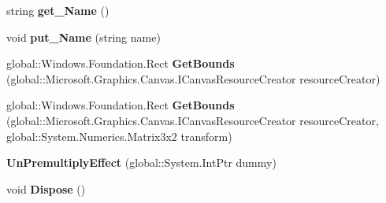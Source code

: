 \begin{DoxyCompactItemize}
\item 
\mbox{\label{class_microsoft_1_1_graphics_1_1_canvas_1_1_effects_1_1_un_premultiply_effect_a1701d736dba660f462b011581f055b17}} 
string {\bfseries get\+\_\+\+Name} ()
\item 
\mbox{\label{class_microsoft_1_1_graphics_1_1_canvas_1_1_effects_1_1_un_premultiply_effect_acd1571fa9f397e1baa0a8c32080b1c2d}} 
void {\bfseries put\+\_\+\+Name} (string name)
\item 
\mbox{\label{class_microsoft_1_1_graphics_1_1_canvas_1_1_effects_1_1_un_premultiply_effect_a5100abdc8715c4ba995f6f6a6e0cb593}} 
global\+::\+Windows.\+Foundation.\+Rect {\bfseries Get\+Bounds} (global\+::\+Microsoft.\+Graphics.\+Canvas.\+I\+Canvas\+Resource\+Creator resource\+Creator)
\item 
\mbox{\label{class_microsoft_1_1_graphics_1_1_canvas_1_1_effects_1_1_un_premultiply_effect_a88c2619b79305957a357452b58d66be6}} 
global\+::\+Windows.\+Foundation.\+Rect {\bfseries Get\+Bounds} (global\+::\+Microsoft.\+Graphics.\+Canvas.\+I\+Canvas\+Resource\+Creator resource\+Creator, global\+::\+System.\+Numerics.\+Matrix3x2 transform)
\item 
\mbox{\label{class_microsoft_1_1_graphics_1_1_canvas_1_1_effects_1_1_un_premultiply_effect_afec8af676d2e6c2a8e095f427e8782f9}} 
{\bfseries Un\+Premultiply\+Effect} (global\+::\+System.\+Int\+Ptr dummy)
\item 
\mbox{\label{class_microsoft_1_1_graphics_1_1_canvas_1_1_effects_1_1_un_premultiply_effect_a046dc1273449b99a5005b41f3a9300ee}} 
void {\bfseries Dispose} ()
\item 
\mbox{\label{class_microsoft_1_1_graphics_1_1_canvas_1_1_effects_1_1_un_premultiply_effect_a8edd8d7c36e87f9f8d1187028b644c4f}} 

\end{DoxyCompactItemize}
